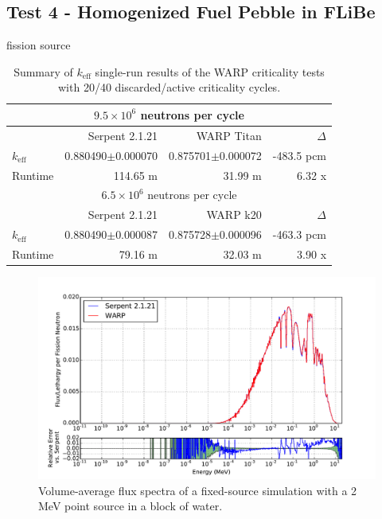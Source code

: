 \documentclass[preprint,12pt]{elsarticle}
\begin{document}
\subsection{Test 4 - Homogenized Fuel Pebble in FLiBe}

fission source

\begin{table}[h]
\centering
\caption{Summary of $k_\mathrm{eff}$ single-run results of the WARP criticality tests with 20/40 discarded/active criticality cycles.}
\label{flibe_table}
\small
\begin{tabular}{| l | r | r | r |}
\hline
\multicolumn{4}{|c|}{$9.5\times10^6$ neutrons per cycle} \\
\hline
                  & Serpent 2.1.21        & WARP Titan               & $\Delta$ \\
\hline
$k_\mathrm{eff}$  & 0.880490$\pm$0.000070 & 0.875701$\pm$0.000072         & -483.5 pcm \\
\hline
Runtime           & 114.65 m              & 31.99 m                  & 6.32 x \\
\hline
\hline
\multicolumn{4}{|c|}{$6.5\times10^6$ neutrons per cycle} \\
\hline
                  & Serpent 2.1.21        & WARP k20            & $\Delta$ \\
\hline
$k_\mathrm{eff}$  & 0.880490$\pm$0.000087 & 0.875728$\pm$0.000096    & -463.3 pcm \\
\hline
Runtime           & 79.16 m              & 32.03 m             & 3.90 x\\
\hline
\end{tabular}
\end{table}


\begin{figure}[h!]
\centering
\includegraphics[width=\textwidth,trim= 1cm 0cm 1cm 0cm]{graphics/flibe_spec.pdf}
\caption{Volume-average flux spectra of a fixed-source simulation with a 2 MeV point source in a block of water. \label{flibe_spec} }
\end{figure}
\end{document}
